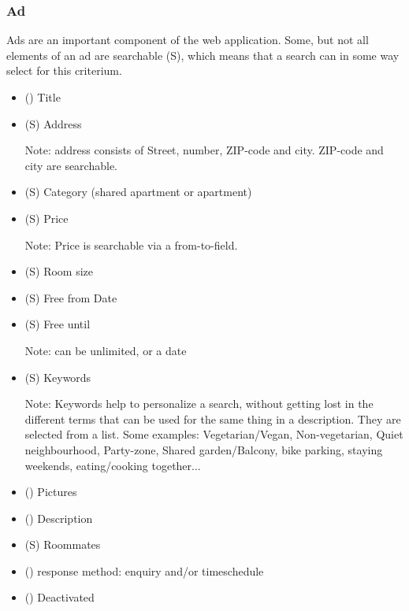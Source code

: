 \documentclass[a4wide]{article}
\begin{document}
\subsubsection{Ad}
Ads are an important component of the web application. 
Some, but not all elements of an ad are searchable (S),
which means that a search can in some way select for this criterium.
\begin{itemize}
\item () Title
\item (S) Address

	Note: address consists of Street, number, ZIP-code and city. ZIP-code and city are searchable.
\item (S) Category (shared apartment or apartment)
\item (S) Price

	Note: Price is searchable via a from-to-field.
\item (S) Room size

\item (S) Free from Date

\item (S) Free until

	Note: can be unlimited, or a date
\item (S) Keywords

	Note: Keywords help to personalize a search, without getting lost in the different terms 
	that can be used for the same thing in a description.
	They are selected from a list.
	Some examples: Vegetarian/Vegan, Non-vegetarian, Quiet neighbourhood, Party-zone, 
	Shared garden/Balcony, bike parking, staying weekends, eating/cooking together...
\item () Pictures
\item () Description
\item (S) Roommates

\item () response method: enquiry and/or timeschedule 
\item () Deactivated
\end{itemize}
\end{document}
